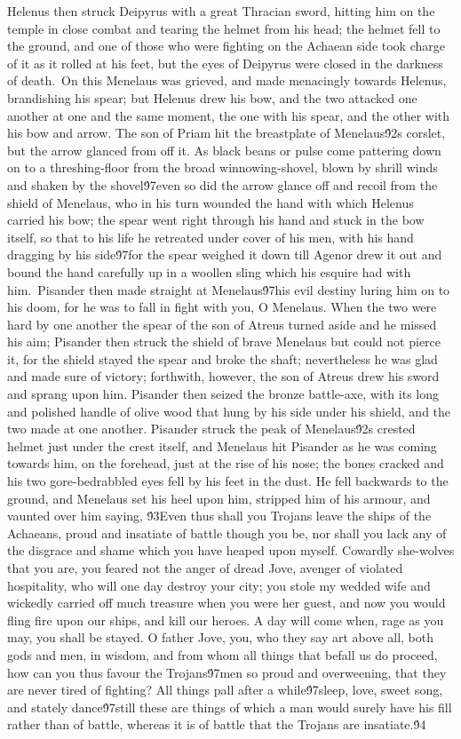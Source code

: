 {Helenus then struck Deipyrus with a great Thracian sword, hitting him on the temple in close combat and tearing the helmet from his head; the helmet fell to the ground, and one of those who were fighting on the Achaean side took charge of it as it rolled at his feet, but the eyes of Deipyrus were closed in the darkness of death.\
On this Menelaus was grieved, and made menacingly towards Helenus, brandishing his spear; but Helenus drew his bow, and the two attacked one another at one and the same moment, the one with his spear, and the other with his bow and arrow. The son of Priam hit the breastplate of Menelaus\'92s corslet, but the arrow glanced from off it. As black beans or pulse come pattering down on to a threshing-floor from the broad winnowing-shovel, blown by shrill winds and shaken by the shovel\'97even so did the arrow glance off and recoil from the shield of Menelaus, who in his turn wounded the hand with which Helenus carried his bow; the spear went right through his hand and stuck in the bow itself, so that to his life he retreated under cover of his men, with his hand dragging by his side\'97for the spear weighed it down till Agenor drew it out and bound the hand carefully up in a woollen sling which his esquire had with him.\
Pisander then made straight at Menelaus\'97his evil destiny luring him on to his doom, for he was to fall in fight with you, O Menelaus. When the two were hard by one another the spear of the son of Atreus turned aside and he missed his aim; Pisander then struck the shield of brave Menelaus but could not pierce it, for the shield stayed the spear and broke the shaft; nevertheless he was glad and made sure of victory; forthwith, however, the son of Atreus drew his sword and sprang upon him. Pisander then seized the bronze battle-axe, with its long and polished handle of olive wood that hung by his side under his shield, and the two made at one another. Pisander struck the peak of Menelaus\'92s crested helmet just under the crest itself, and Menelaus hit Pisander as he was coming towards him, on the forehead, just at the rise of his nose; the bones cracked and his two gore-bedrabbled eyes fell by his feet in the dust. He fell backwards to the ground, and Menelaus set his heel upon him, stripped him of his armour, and vaunted over him saying, \'93Even thus shall you Trojans leave the ships of the Achaeans, proud and insatiate of battle though you be, nor shall you lack any of the disgrace and shame which you have heaped upon myself. Cowardly she-wolves that you are, you feared not the anger of dread Jove, avenger of violated hospitality, who will one day destroy your city; you stole my wedded wife and wickedly carried off much treasure when you were her guest, and now you would fling fire upon our ships, and kill our heroes. A day will come when, rage as you may, you shall be stayed. O father Jove, you, who they say art above all, both gods and men, in wisdom, and from whom all things that befall us do proceed, how can you thus favour the Trojans\'97men so proud and overweening, that they are never tired of fighting? All things pall after a while\'97sleep, love, sweet song, and stately dance\'97still these are things of which a man would surely have his fill rather than of battle, whereas it is of battle that the Trojans are insatiate.\'94\
}
